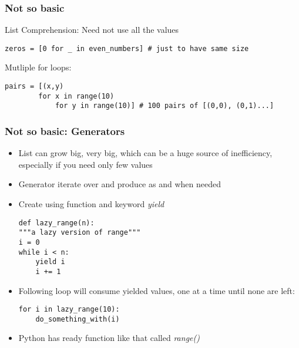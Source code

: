 \begin{frame}[fragile]\frametitle{Not so basic}
List Comprehension: Need not use all the values
  \begin{lstlisting}
zeros = [0 for _ in even_numbers] # just to have same size
  \end{lstlisting}
Mutliple for loops:
  \begin{lstlisting}
pairs = [(x,y)
		for x in range(10)
			for y in range(10)] # 100 pairs of [(0,0), (0,1)...]
  \end{lstlisting}
\end{frame}

\begin{frame}[fragile]\frametitle{Not so basic: Generators}
  \begin{itemize}
  \item List can grow big, very big, which can be a huge source of inefficiency, especially if you need only few values
   \item Generator iterate over and produce as and when needed
   \item Create using function and keyword {\em yield}
  \begin{lstlisting}
def lazy_range(n):
"""a lazy version of range"""
i = 0
while i < n:
    yield i
    i += 1
  \end{lstlisting}
\item Following loop will consume yielded values, one at a time until none are left:
  \begin{lstlisting}
for i in lazy_range(10):
	do_something_with(i)
  \end{lstlisting}
\item Python has ready function like that called {\em range()}
  \end{itemize}
\end{frame}


